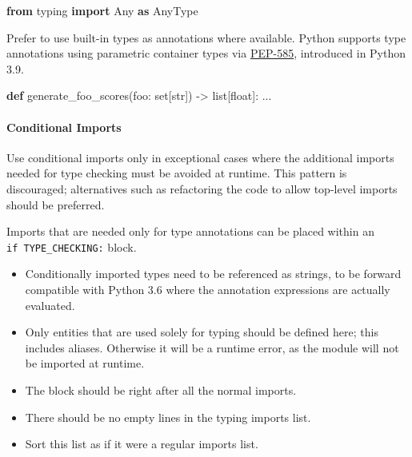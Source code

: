 \documentclass[
]{article}
\newenvironment{Shaded}{}{}
\newcommand{\BuiltInTok}[1]{\textcolor[rgb]{0.00,0.50,0.00}{#1}}
\newcommand{\ImportTok}[1]{\textcolor[rgb]{0.00,0.50,0.00}{\textbf{#1}}}
\newcommand{\KeywordTok}[1]{\textcolor[rgb]{0.00,0.44,0.13}{\textbf{#1}}}
\newcommand{\NormalTok}[1]{#1}
\newcommand{\OperatorTok}[1]{\textcolor[rgb]{0.40,0.40,0.40}{#1}}
\providecommand{\tightlist}{%
  \setlength{\itemsep}{0pt}\setlength{\parskip}{0pt}}
\begin{document}
\begin{samepage}
\begin{Shaded}
\begin{Highlighting}[]
\ImportTok{from}\NormalTok{ typing }\ImportTok{import}\NormalTok{ Any }\ImportTok{as}\NormalTok{ AnyType}
\end{Highlighting}
\end{Shaded}
\end{samepage}

Prefer to use built-in types as annotations where available. Python
supports type annotations using parametric container types via
\href{https://peps.python.org/pep-0585/}{PEP-585}, introduced in Python
3.9.

\begin{samepage}
\begin{Shaded}
\begin{Highlighting}[]
\KeywordTok{def}\NormalTok{ generate\_foo\_scores(foo: }\BuiltInTok{set}\NormalTok{[}\BuiltInTok{str}\NormalTok{]) }\OperatorTok{{-}\textgreater{}} \BuiltInTok{list}\NormalTok{[}\BuiltInTok{float}\NormalTok{]:}
\NormalTok{  ...}
\end{Highlighting}
\end{Shaded}
\end{samepage}

\paragraph{Conditional Imports}

Use conditional imports only in exceptional cases where the additional
imports needed for type checking must be avoided at runtime. This
pattern is discouraged; alternatives such as refactoring the code to
allow top-level imports should be preferred.

Imports that are needed only for type annotations can be placed within
an \texttt{if\ TYPE\_CHECKING:} block.

\begin{itemize}
\tightlist
\item
  Conditionally imported types need to be referenced as strings, to be
  forward compatible with Python 3.6 where the annotation expressions
  are actually evaluated.
\item
  Only entities that are used solely for typing should be defined here;
  this includes aliases. Otherwise it will be a runtime error, as the
  module will not be imported at runtime.
\item
  The block should be right after all the normal imports.
\item
  There should be no empty lines in the typing imports list.
\item
  Sort this list as if it were a regular imports list.
\end{itemize}
\end{document}

